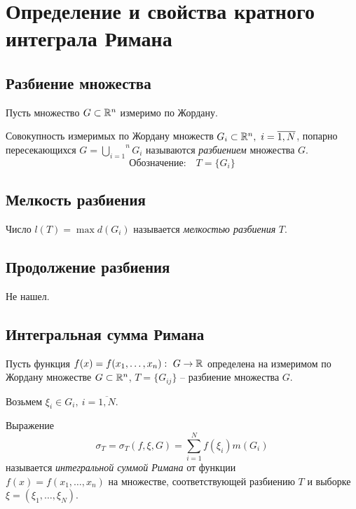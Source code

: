 \section{Определение и свойства кратного интеграла Римана}

\setcounter{subsection}{137}

\subsection{Разбиение множества}

\begin{definition}
    Пусть множество $ G \subset \mathbb{R}^n $ измеримо по Жордану.

    Совокупность измеримых по Жордану множеств $ G_i \subset \mathbb{R}^n, \ i = \overline{1,N} $, попарно пересекающихся $ G = \overset{n}{\underset{i=1}{\bigcup}}G_i $ называются \emph{разбиением} множества $ G $.
    \[
        \text{Обозначение:}\quad T = \{G_i\}
    \]
\end{definition}

\subsection{Мелкость разбиения}

\begin{definition}
    Число $ l(T) = \max d(G_i) $ называется \emph{мелкостью разбиения} $ T $.
\end{definition}

\subsection{Продолжение разбиения}

Не нашел.

\subsection{Интегральная сумма Римана}

\begin{definition}
    Пусть функция $ f(x) = f(x_1,\ldots,x_n): \ G \rightarrow \R $ определена на измеримом по Жордану множестве $ G \subset \mathbb{R}^n $, $T = \{G_{ij}\}$ -- разбиение множества $ G $.

    Возьмем $ \xi_i \in G_i, \ i = \overline{1,N} $.

    Выражение
    \[
        \sigma_T = \sigma_T(f,\xi,G) = \sum_{i=1}^{N}f(\xi_i)m(G_i)
    \]
    называется \emph{интегральной суммой Римана} от функции \\ $ f(x) = f(x_1,\ldots,x_n) $ на множестве, соответствующей разбиению $ T $ и выборке $ \xi = (\xi_1,\ldots,\xi_N) $.
\end{definition}

